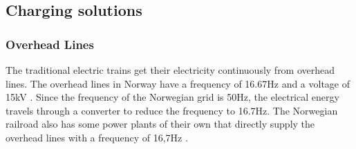\documentclass{article}
\begin{document}
\begin{table}[H]
\end{table}

\cite{max} \cite{vanzwol} \cite{toi}





\subsection{Charging solutions}

\subsubsection*{Overhead Lines}

The traditional electric trains get their electricity continuously from overhead lines. The overhead lines in Norway have a frequency of 16.67Hz and a voltage of 15kV \cite{bn_1}.
Since the frequency of the Norwegian grid is 50Hz, the electrical energy travels through a converter to reduce the frequency to 16.7Hz. The Norwegian railroad also has some power plants of their own that directly supply the overhead lines with a frequency of 16,7Hz \cite{bn_2}. 
\end{document}
